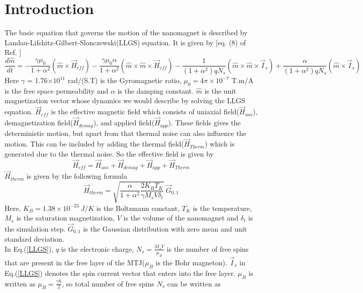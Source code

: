 \documentclass[review]{elsarticle}
\begin{document}
\section{Introduction}
The basic equation that governs the motion of the nanomagnet is described by Landau-Lifshitz-Gilbert-Slonczewski(LLGS) equation. It is given by [eq. (8) of Ref. \cite{sengupta2017encoding}] 
\begin{equation}
	\frac{d\hat{m}}{dt}=-\frac{\gamma \mu_0}{1+\alpha^2}\left(\hat{m}\times \overrightarrow{H}_{eff}\right) -\frac{\gamma \mu_0 \alpha}{1+\alpha^2}\left(\hat{m}\times\hat{m}\times \overrightarrow{H}_{eff}\right) -\frac{1}{(1+\alpha^2)qN_s}\left(\hat{m}\times\hat{m}\times\overrightarrow{I}_s\right) +\frac{\alpha}{(1+\alpha^2)qN_s}\left(\hat{m}\times\overrightarrow{I}_s\right)
	\label{LLGS}
\end{equation}
Here $\gamma$ = 1.76$\times10^{11}$ rad/(S.T) is the Gyromagnetic ratio, $\mu_0 = 4\pi \times 10^{-7}$ T.m/A is the free space permeability and $\alpha$ is the damping constant. $\hat{m}$ is the unit magnetization vector whose dynamics we would describe by solving the LLGS equation. $\overrightarrow{H}_{eff}$ is the effective magnetic field which consists of uniaxial field($\overrightarrow{H}_{uni}$), demagnetization field($\overrightarrow{H}_{demag}$), and applied field($\overrightarrow{H}_{app}$). These fields gives the deterministic motion, but apart from that thermal noise can also influence the motion. This can be included by adding the thermal field($\overrightarrow{H}_{Therm}$) which is generated due to the thermal noise. So the effective field is given by 
\begin{equation}
	\overrightarrow{H}_{eff}=\overrightarrow{H}_{uni} + \overrightarrow{H}_{demag} + \overrightarrow{H}_{app} + \overrightarrow{H}_{Therm}
\end{equation}
$\overrightarrow{H}_{therm}$ is given by the following formula
\begin{equation}
	\overrightarrow{H}_{therm} = \sqrt{\frac{\alpha}{1+\alpha^2}\frac{2 K_B T_K}{\gamma M_s V \delta_t}}~\overrightarrow{G}_{0,1}
\end{equation}
Here, $K_B=1.38\times 10^{-23}~J/K$ is the Boltzmann constant, $T_K$ is the temperature, $M_s$ is the saturation magnetization, $V$ is the volume of the nanomagnet and $\delta_t$ is the simulation step. $\overrightarrow{G}_{0,1}$ is the Gaussian distribution with zero mean and unit standard deviation. \\
In Eq.(\ref{LLGS}), $q$ is the electronic charge, $N_s=\frac{M_s V}{\mu_B}$ is the number of free spins that are present in the free layer of the MTJ($\mu_B$ is the Bohr magneton). $\overrightarrow{I}_s$ in Eq.(\ref{LLGS}) denotes the spin current vector that enters into the free layer. $\mu_B$ is written as $\mu_B=\frac{\gamma \hbar}{2}$, so total number of free spins $N_s$ can be written as 
\end{document}
